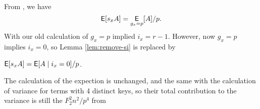 From , we have
\begin{equation*}
\operatorname*{\sf{E}}[s_xA]=\operatorname*{\sf{E}}_{g_x=p}[A]/p.
\end{equation*}
With our old calculation of $g_x=p$ implied $i_x=r-1$. However, now 
$g_x=p$ implies $i_x=0$, so Lemma \ref{lem:remove-si} is replaced
by 
\begin{lemma}\label{lem:remove-si-k}
$\E[s_xA]=\E[A\suchthat i_x=0]/p$.
\end{lemma}
The calculation of the expection is unchanged, and the same with the
calculation of variance for terms with 4 distinct keys, so their
total contribution to the variance is still the $F_2^2 n^2/p^4$ from

